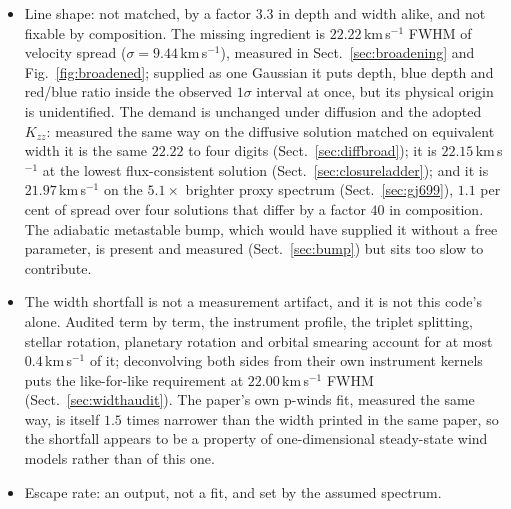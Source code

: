 \documentclass[english,a4paper]{my_memo}
\begin{document}
\begin{itemize}
      boundary chose its entropy branch on the velocity in the first cell
      rather than on the mass flux through its face, so the campaign of
      2026-09-14 carried a $418$\,K first cell where the prescribed
      reservoir was $226$\,K (Sect.~\ref{sec:l21}). That correction takes
      the base cell down by a median $46$ per cent in temperature, $\dot M$
      down by $2$ per cent everywhere, and the crossings \emph{up} by $1.5$
      to $14$ per cent with diffusion, and by $0.8$ and $0.002$ per cent in
      the two well-mixed groups.
\item Line shape: not matched, by a factor $3.3$ in depth and width alike,
      and not fixable by composition. The missing ingredient is
      $22.22$\,km\,s$^{-1}$ FWHM of velocity spread ($\sigma =
      9.44$\,km\,s$^{-1}$), measured in Sect.~\ref{sec:broadening} and
      Fig.~\ref{fig:broadened}; supplied as one Gaussian it puts depth,
      blue depth and red/blue ratio inside the observed $1\sigma$ interval
      at once, but its physical origin is unidentified. The demand is
      unchanged under diffusion and the adopted $K_{zz}$: measured the same
      way on the diffusive solution matched on equivalent width it is the
      same $22.22$ to four digits (Sect.~\ref{sec:diffbroad}); it is
      $22.15$\,km\,s$^{-1}$ at the lowest flux-consistent solution
      (Sect.~\ref{sec:closureladder}); and it is $21.97$\,km\,s$^{-1}$ on
      the $5.1\times$ brighter proxy spectrum (Sect.~\ref{sec:gj699}), $1.1$
      per cent of spread over four solutions that differ by a factor $40$ in
      composition. The adiabatic metastable bump, which would have supplied
      it without a free parameter, is present and measured
      (Sect.~\ref{sec:bump}) but sits too slow to contribute.
\item The width shortfall is not a measurement artifact, and it is not this
      code's alone. Audited term by term, the instrument profile,
      the triplet splitting, stellar rotation, planetary rotation and
      orbital smearing account for at most $0.4$\,km\,s$^{-1}$ of it;
      deconvolving both sides from their own instrument kernels puts the
      like-for-like requirement at $22.00$\,km\,s$^{-1}$ FWHM
      (Sect.~\ref{sec:widthaudit}). The paper's own p-winds fit, measured
      the same way, is itself $1.5$ times narrower than the width printed in
      the same paper, so the shortfall appears to be a property of
      one-dimensional steady-state wind models rather than of this one.
\item Escape rate: an output, not a fit, and set by the assumed spectrum.

\end{itemize}
\end{document}
